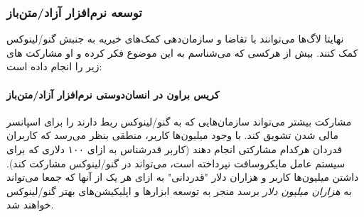 \subsubsection{توسعه نرم‌افزار آزاد/متن‌باز}

نهایتا لاگ‌ها می‌توانند با تقاضا و سازمان‌دهی کمک‌های خیریه
به جنبش گنو/لینوکس کمک کنند.
بیش از هرکسی که می‌شناسم به این موضوع فکر کرده و او مشارکت
های زیر را انجام داده است:

\paragraph{کریس براون در انسان‌دوستی نرم‌افزار آزاد/متن‌باز}

مشارکت بیشتر می‌تواند سازمان‌هایی که به گنو/لینوکس ربط دارند را
برای اسپانسر مالی شدن تشویق کند. با وجود میلیون‌ها کاربر، منطقی
بنظر می‌رسد که کاربران قدردان هرکدام مشارکتی انجام دهند
(کاربر قدرشناس به ازای ۱۰۰ دلاری که برای سیستم عامل مایکروسافت
نپرداخته است، می‌تواند در گنو/لینوکس مشارکت کند).
داشتن میلیون‌ها کاربر و هزاران دلار "قدردانی" به ازای هر یک از آنها
که جمعا می‌تواند به
{\itshape هزاران میلیون دلار}
برسد منجر به توسعه ابزار‌ها و اپلیکیشن‌های بهتر گنو/لینوکس خواهند شد.


